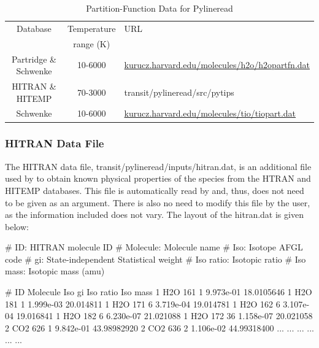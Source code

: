 \documentclass[letterpaper, 12pt]{article}
\begin{document}
\begin{table}[ht]
\centering
\caption{Partition-Function Data for Pylineread}
\label{table:PFs}
\begin{tabular}{ccl}
\hline
\hline
Database              & Temperature & URL \\
                      & range (K) &       \\
\hline
Partridge \& Schwenke & 10-6000   & \href{http://kurucz.harvard.edu/molecules/h2o/h2opartfn.dat}{kurucz.harvard.edu/molecules/h2o/h2opartfn.dat} \\
HITRAN \& HITEMP      & 70-3000   & transit/pylineread/src/pytips \\
Schwenke              & 10-6000   & \href{http://kurucz.harvard.edu/molecules/tio/tiopart.dat}{kurucz.harvard.edu/molecules/tio/tiopart.dat} \\
\hline
\end{tabular}
\end{table}


\subsubsection{HITRAN Data File}

The HITRAN data file, {\tttm transit/pylineread/inputs/hitran.dat},
is an additional file used by {\pylineread} to obtain known physical
properties of the species from the HTRAN and HITEMP databases.  This
file is automatically read by {\pylineread} and, thus, does not need
to be given as an argument.  There is also no need to modify this file
by the user, as the information included does not vary.  The layout of
the {\tttm hitran.dat} is given below: \newline

\begin{plain}
# ID:         HITRAN molecule ID
# Molecule:   Molecule name
# Iso:        Isotope AFGL code
# gi:         State-independent Statistical weight
# Iso ratio:  Isotopic ratio
# Iso mass:   Isotopic mass (amu)

# ID Molecule Iso        gi         Iso ratio    Iso mass
 1   H2O      161         1         9.973e-01    18.0105646
 1   H2O      181         1         1.999e-03    20.014811
 1   H2O      171         6         3.719e-04    19.014781
 1   H2O      162         6         3.107e-04    19.016841
 1   H2O      182         6         6.230e-07    21.021088
 1   H2O      172        36         1.158e-07    20.021058
 2   CO2      626         1         9.842e-01    43.98982920
 2   CO2      636         2         1.106e-02    44.99318400
...  ...      ...        ...           ...           ...
\end{plain}
\end{document}
